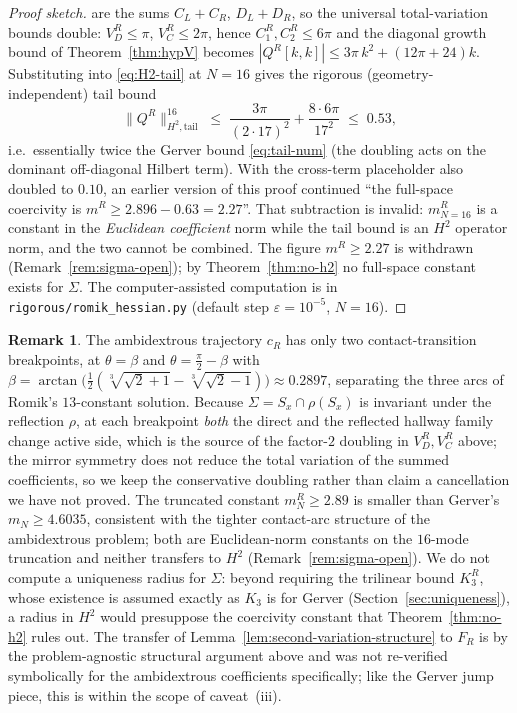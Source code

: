 \documentclass[11pt]{amsart}
\theoremstyle{plain}
\theoremstyle{definition}
\newtheorem{remark}[theorem]{Remark}
\begin{document}
\begin{proof}[Proof sketch]
are the sums $C_{L}+C_{R}$, $D_{L}+D_{R}$, so the universal
total-variation bounds double:
$V_{D}^{R}\leq\pi$, $V_{C}^{R}\leq 2\pi$, hence
$C_{1}^{R},C_{2}^{R}\leq 6\pi$ and the diagonal growth bound of
Theorem~\ref{thm:hypV} becomes
$|Q^{R}[k,k]|\leq 3\pi\,k^{2}+(12\pi+24)k$.  Substituting into
\eqref{eq:H2-tail} at $N=16$ gives the rigorous (geometry-independent)
tail bound
\begin{equation}\label{eq:tail-num-romik}
   \|Q^{R}\|_{H^{2},\mathrm{tail}}^{16}
   \;\leq\; \frac{3\pi}{(2\cdot 17)^{2}} + \frac{8\cdot 6\pi}{17^{2}}
   \;\leq\; 0.53,
\end{equation}
i.e.\ essentially twice the Gerver bound \eqref{eq:tail-num} (the
doubling acts on the dominant off-diagonal Hilbert term).  With the
cross-term placeholder also doubled to $0.10$, an earlier version of
this proof continued ``the full-space coercivity is
$m^{R}\geq 2.896-0.63=2.27$''.  That subtraction is invalid:
$m_{N=16}^{R}$ is a constant in the \emph{Euclidean coefficient} norm
while the tail bound is an $H^{2}$ operator norm, and the two cannot be
combined.  The figure $m^{R}\geq2.27$ is withdrawn
(Remark~\ref{rem:sigma-open}); by Theorem~\ref{thm:no-h2} no
full-space constant exists for $\Sigma$.
The computer-assisted computation is in
\texttt{rigorous/romik\_hessian.py} (default step $\varepsilon=10^{-5}$,
$N=16$).
\end{proof}

\begin{remark}
The ambidextrous trajectory $c_{R}$ has only two contact-transition
breakpoints, at $\theta=\beta$ and $\theta=\tfrac\pi2-\beta$ with
$\beta = \arctan\!\bigl(\tfrac12(\sqrt[3]{\sqrt2+1}-\sqrt[3]{\sqrt2-1})\bigr)
\approx 0.2897$, separating the three arcs of Romik's $13$-constant
solution.  Because $\Sigma = S_{x}\cap\rho(S_{x})$ is invariant under
the reflection $\rho$, at each breakpoint \emph{both} the direct and
the reflected hallway family change active side, which is the source
of the factor-$2$ doubling in $V_{D}^{R},V_{C}^{R}$ above; the
mirror symmetry does not reduce the total variation of the summed
coefficients, so we keep the conservative doubling rather than
claim a cancellation we have not proved.  The truncated constant
$m_{N}^{R}\geq 2.89$ is smaller than Gerver's $m_{N}\geq 4.6035$,
consistent with the tighter contact-arc structure of the ambidextrous
problem; both are Euclidean-norm constants on the $16$-mode
truncation and neither transfers to $H^{2}$
(Remark~\ref{rem:sigma-open}).  We do not
compute a uniqueness radius for $\Sigma$: beyond requiring the
trilinear bound $K_{3}^{R}$, whose existence is assumed
exactly as $K_{3}$ is for Gerver (Section~\ref{sec:uniqueness}), a
radius in $H^{2}$ would presuppose the coercivity constant that
Theorem~\ref{thm:no-h2} rules out.
The transfer of Lemma~\ref{lem:second-variation-structure} to
$F_{R}$ is by the problem-agnostic structural argument above and was
not re-verified symbolically for the ambidextrous coefficients
specifically; like the Gerver jump piece, this is within the scope
of caveat~(iii).
\end{remark}
\end{document}
